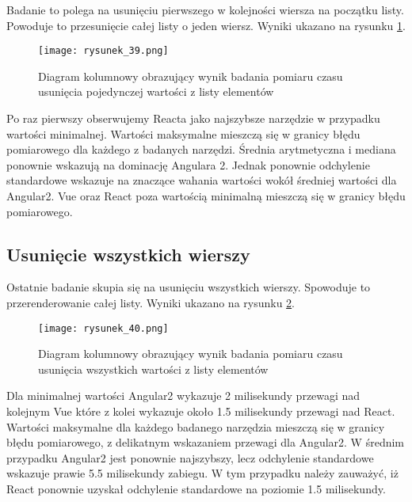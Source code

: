 Badanie to polega na usunięciu pierwszego w kolejności wiersza na początku listy. Powoduje to przesunięcie całej listy o jeden wiersz. Wyniki ukazano na rysunku \ref{fig:rysunek_39}.

\begin{figure}[!ht]
    \centering
    \texttt{[image: rysunek\_39.png]}
    \caption{Diagram kolumnowy obrazujący wynik badania pomiaru czasu usunięcia pojedynczej wartości z listy elementów}
    \label{fig:rysunek_39}
\end{figure}

Po raz pierwszy obserwujemy Reacta jako najszybsze narzędzie w przypadku wartości minimalnej.
Wartości maksymalne mieszczą się w granicy błędu pomiarowego dla każdego z badanych narzędzi. Średnia arytmetyczna i mediana ponownie wskazują na dominację Angulara 2.
Jednak ponownie odchylenie standardowe wskazuje na znaczące wahania wartości wokół średniej wartości dla Angular2.
Vue oraz React poza wartością minimalną mieszczą się w granicy błędu pomiarowego.

\subsection{Usunięcie wszystkich wierszy}

Ostatnie badanie skupia się na usunięciu wszystkich wierszy. Spowoduje to przerenderowanie całej listy. Wyniki ukazano na rysunku \ref{fig:rysunek_40}. 

\begin{figure}[!ht]
    \centering
    \texttt{[image: rysunek\_40.png]}
    \caption{Diagram kolumnowy obrazujący wynik badania pomiaru czasu usunięcia wszystkich wartości z listy elementów}
    \label{fig:rysunek_40}
\end{figure}

Dla minimalnej wartości Angular2 wykazuje 2 milisekundy przewagi nad kolejnym Vue które z kolei wykazuje około 1.5 milisekundy przewagi nad React.
Wartości maksymalne dla każdego badanego narzędzia mieszczą się w granicy błędu pomiarowego, z delikatnym wskazaniem przewagi dla Angular2.
W średnim przypadku Angular2 jest ponownie najszybszy, lecz odchylenie standardowe wskazuje prawie 5.5 milisekundy zabiegu.
W tym przypadku należy zauważyć, iż React ponownie uzyskał odchylenie standardowe na poziomie 1.5 milisekundy.

\let\cleardoublepage\clearpage